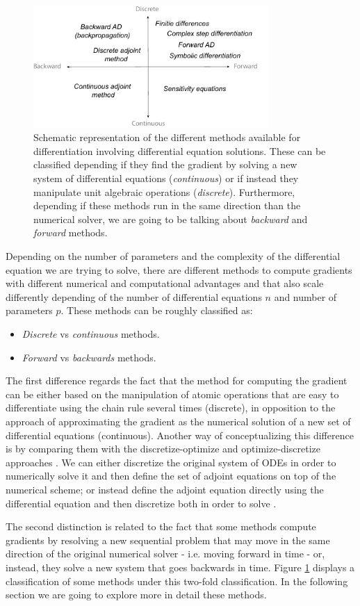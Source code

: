 \begin{figure}[]
    \centering
    \includegraphics[width=0.80\textwidth]{figures/scheme-methods.pdf}
    \caption{Schematic representation of the different methods available for differentiation involving differential equation solutions. These can be classified depending if they find the gradient by solving a new system of differential equations (\textit{continuous}) or if instead they manipulate unit algebraic operations (\textit{discrete}). Furthermore, depending if these methods run in the same direction than the numerical solver, we are going to be talking about \textit{backward} and \textit{forward} methods.}
    \label{fig:diff}
\end{figure}
Depending on the number of parameters and the complexity of the differential equation we are trying to solve, there are different methods to compute gradients with different numerical and computational advantages and that also scale differently depending of the number of differential equations $n$ and number of parameters $p$.
These methods can be roughly classified as:
\begin{itemize}
    \item \textit{Discrete} vs \textit{continuous} methods.
    \item \textit{Forward} vs \textit{backwards} methods.
\end{itemize}
The first difference regards the fact that the method for computing the gradient can be either based on the manipulation of atomic operations that are easy to differentiate using the chain rule several times (discrete), in opposition to the approach of approximating the gradient as the numerical solution of a new set of differential equations (continuous).
Another way of conceptualizing this difference is by comparing them with the discretize-optimize and optimize-discretize approaches \cite{bradley2013pde, Onken_Ruthotto_2020}.   
We can either discretize the original system of ODEs in order to numerically solve it and then define the set of adjoint equations on top of the numerical scheme; or instead define the adjoint equation directly using the differential equation and then discretize both in order to solve \cite{Giles_Pierce_2000}.

The second distinction is related to the fact that some methods compute gradients by resolving a new sequential problem that may move in the same direction of the original numerical solver - i.e. moving forward in time - or, instead, they solve a new system that goes backwards in time. 
Figure \ref{fig:diff} displays a classification of some methods under this two-fold classification. In the following section we are going to explore more in detail these methods.